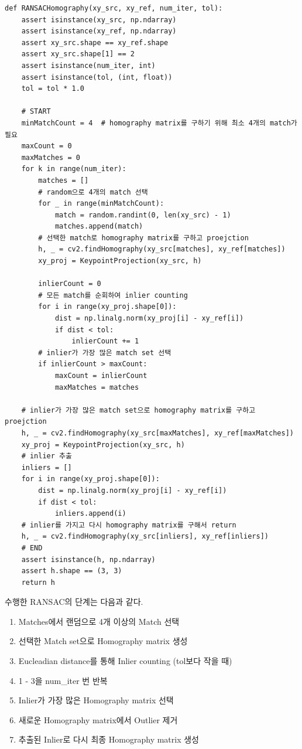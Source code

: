 \documentclass[]{report}
\begin{document}
\begin{lstlisting}
def RANSACHomography(xy_src, xy_ref, num_iter, tol):
    assert isinstance(xy_src, np.ndarray)
    assert isinstance(xy_ref, np.ndarray)
    assert xy_src.shape == xy_ref.shape
    assert xy_src.shape[1] == 2
    assert isinstance(num_iter, int)
    assert isinstance(tol, (int, float))
    tol = tol * 1.0

    # START
    minMatchCount = 4  # homography matrix를 구하기 위해 최소 4개의 match가 필요
    maxCount = 0
    maxMatches = 0
    for k in range(num_iter):
        matches = []
        # random으로 4개의 match 선택
        for _ in range(minMatchCount):
            match = random.randint(0, len(xy_src) - 1)
            matches.append(match)
        # 선택한 match로 homography matrix를 구하고 proejction
        h, _ = cv2.findHomography(xy_src[matches], xy_ref[matches])
        xy_proj = KeypointProjection(xy_src, h)

        inlierCount = 0
        # 모든 match를 순회하여 inlier counting
        for i in range(xy_proj.shape[0]):
            dist = np.linalg.norm(xy_proj[i] - xy_ref[i])
            if dist < tol:
                inlierCount += 1
        # inlier가 가장 많은 match set 선택
        if inlierCount > maxCount:
            maxCount = inlierCount
            maxMatches = matches

    # inlier가 가장 많은 match set으로 homography matrix를 구하고 proejction
    h, _ = cv2.findHomography(xy_src[maxMatches], xy_ref[maxMatches])
    xy_proj = KeypointProjection(xy_src, h)
    # inlier 추출
    inliers = []
    for i in range(xy_proj.shape[0]):
        dist = np.linalg.norm(xy_proj[i] - xy_ref[i])
        if dist < tol:
            inliers.append(i)
    # inlier를 가지고 다시 homography matrix를 구해서 return
    h, _ = cv2.findHomography(xy_src[inliers], xy_ref[inliers])
    # END
    assert isinstance(h, np.ndarray)
    assert h.shape == (3, 3)
    return h
\end{lstlisting}

수행한 RANSAC의 단계는 다음과 같다. \\

\begin{enumerate}
	\item Matches에서 랜덤으로 4개 이상의 Match 선택
	\item 선택한 Match set으로 Homography matrix 생성
	\item Eucleadian distance를 통해 Inlier counting (tol보다 작을 때)
	\item 1 - 3을 num\_iter 번 반복
	\item Inlier가 가장 많은 Homography matrix 선택
	\item 새로운 Homography matrix에서 Outlier 제거
	\item 추출된 Inlier로 다시 최종 Homography matrix 생성 \\
\end{enumerate}
\end{document}
